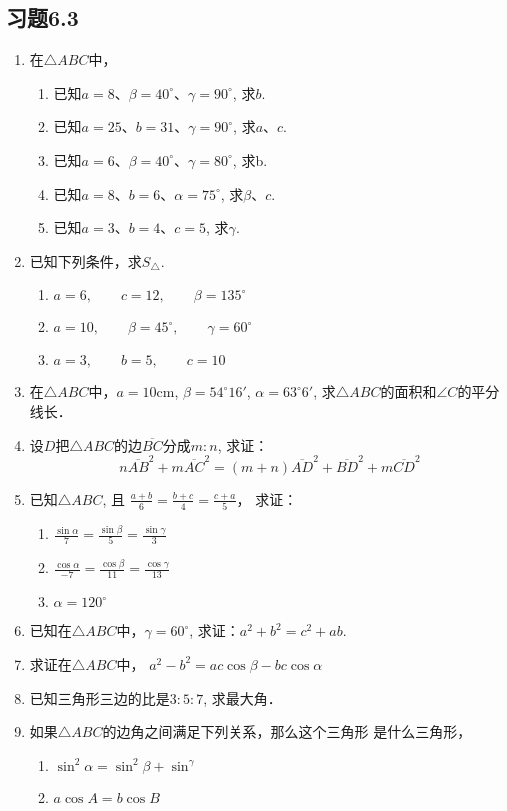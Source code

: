 \subsection*{习题6.3}
\begin{enumerate}
    \item 在$\triangle ABC$中，
\begin{enumerate}
    \item 已知$a=8$、$\beta=40^{\circ}$、$\gamma=90^{\circ}$, 求$b$.
    \item 已知$a=25$、$b=31$、$\gamma=90^{\circ}$, 求$a$、$c$.
    \item 已知$a=6$、$\beta=40^{\circ}$、$\gamma=80^{\circ}$, 求b.
    \item 已知$a=8$、$b=6$、$\alpha=75^{\circ}$, 求$\beta$、$c$.
    \item 已知$a=3$、$b=4$、$c=5$, 求$\gamma$.
\end{enumerate}
\item  已知下列条件，求$S_{\triangle}$.
\begin{enumerate}
    \item $a=6,\qquad c=12,\qquad \beta =135^{\circ}$
    \item $a=10,\qquad \beta =45^{\circ},\qquad \gamma=60^{\circ}$
    \item $a=3,\qquad b=5,\qquad c=10$
\end{enumerate}

\item  在$\triangle ABC$中，$a=10$cm, $\beta =54^{\circ}16'$, $\alpha=63^{\circ}6'$, 求$\triangle ABC$的面积和$\angle C$的平分线长．
\item  设$D$把$\triangle ABC$的边$\overline{BC}$分成$m:n$, 求证：
\[n\overline{AB}^2+m \overline{AC}^2=(m+n)\overline{AD}^2+\overline{BD}^2+m\overline{CD}^2\]
\item  已知$\triangle ABC$, 且
$\frac{a+b}{6}=\frac{b+c}{4}=\frac{c+a}{5}$，
求证：
\begin{enumerate}
    \item $\frac{\sin\alpha}{7}=\frac{\sin\beta}{5}=\frac{\sin\gamma}{3}$
    \item $\frac{\cos\alpha}{-7}=\frac{\cos\beta}{11}=\frac{\cos\gamma}{13}$
    \item $\alpha=120^{\circ}$
\end{enumerate}
\item  已知在$\triangle ABC$中，$\gamma=60^{\circ}$, 求证：$a^2+b^2=c^2+ab$.
\item  求证在$\triangle ABC$中，
$a^2-b^2=ac\cos\beta -bc\cos\alpha$
\item  已知三角形三边的比是$3:5:7$, 求最大角．
\item  如果$\triangle ABC$的边角之间满足下列关系，那么这个三角形
是什么三角形，
\begin{enumerate}
    \item $\sin^2\alpha=\sin^2\beta +\sin^\gamma$
    \item $a\cos A=b\cos B$
\end{enumerate}


\end{enumerate}
